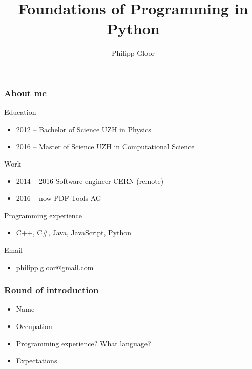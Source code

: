 \documentclass[10pt, a4paper]{beamer} %
\title %
{Foundations of Programming in Python}
\author %
{Philipp Gloor\inst{1}}
\institute
{
  \inst{1}%
  University of Zurich
}
\date{}
\begin{document}
\begin{frame}
\titlepage
\end{frame}

\begin{frame}
\frametitle{About me}

\begin{block}{Education}
    \begin{itemize}
        \item 2012 -- Bachelor of Science UZH in Physics
        \item 2016 -- Master of Science UZH in Computational Science
    \end{itemize}
\end{block}

\begin{block}{Work}
    \begin{itemize}
        \item 2014 -- 2016 Software engineer CERN (remote)
        \item 2016 -- now PDF Tools AG
    \end{itemize}
\end{block}

\begin{block}{Programming experience}
    \begin{itemize}
        \item[] C++, C\#, Java, JavaScript, Python
    \end{itemize}
\end{block}

\begin{block}{Email}
\begin{itemize}
    \item[] philipp.gloor@gmail.com
\end{itemize}
    
\end{block}
 
 
 
 
\end{frame}
\begin{frame}[t]\frametitle{Round of introduction}
    \begin{itemize}
        \item Name
        \item Occupation
        \item Programming experience? What language?
        \item Expectations
    \end{itemize}
\end{frame}
\end{document}
